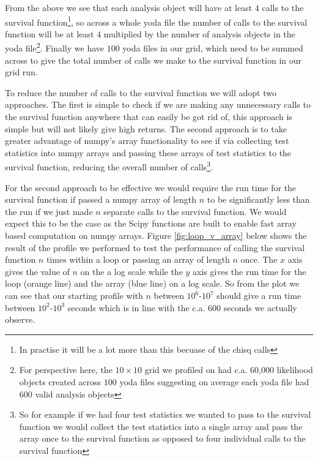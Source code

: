From the above we see that each analysis object will have at least $4$ calls to the survival function\footnote{In practise it will be a lot more than this becuase of the chisq calls}, so across a whole yoda file the number of calls to the survival function will be at least $4$ multiplied by the number of analysis objects in the yoda file\footnote{For perspective here, the $10\times 10$ grid we profiled on had c.a. 60,000 likelihood objects created across $100$ yoda files suggesting on average each yoda file had $600$ valid analysis objects}. Finally we have $100$ yoda files in our grid, which need to be summed across to give the total number of calls we make to the survival function in our grid run.

To reduce the number of calls to the survival function we will adopt two approaches. The first is simple to check if we are making any unnecessary calls to the survival function anywhere that can easily be got rid of, this approach is simple but will not likely give high returns. The second approach is to take greater advantage of numpy's array functionality to see if via collecting test statistics into numpy arrays and passing these arrays of test statistics to the survival function, reducing the overall number of calls\footnote{So for example if we had four test statistics we wanted to pass to the survival function we would collect the test statistics into a single array and pass the array once to the survival function as opposed to four individual calls to the survival function}.

For the second approach to be effective we would require the run time for the survival function if passed a numpy array of length $n$ to be significantly less than the run if we just made $n$ separate calls to the survival function. We would expect this to be the case as the Scipy functions are built to enable fast array based computation on numpy arrays. Figure \ref{fig:loop_v_array} below shows the result of the profile we performed to test the performance of calling the survival function $n$ times within a loop or passing an array of length $n$ once. The $x$ axis gives the value of $n$ on the a log scale while the $y$ axis gives the run time for the loop (orange line) and the array (blue line) on a log scale. So from the plot we can see that our starting profile with $n$ between $10^6$-$10^7$ should give a run time between $10^2$-$10^3$ seconds which is in line with the c.a. $600$ seconds we actually observe.

